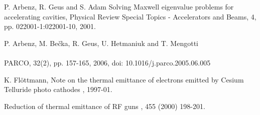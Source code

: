 \begin{thebibliography}{10}

P. Arbenz, R. Geus and S. Adam
{Solving Maxwell eigenvalue problems for accelerating cavities,
Physical Review Special Topics - Accelerators and Beams,
4, pp. 022001-1:022001-10, 2001.}

P. Arbenz, M. Be\v{c}ka, R. Geus, U. Hetmaniuk and T. Mengotti\\
\\
PARCO, 32(2), pp. 157-165, 2006, doi: 10.1016/j.parco.2005.06.005


K. Fl\"ottmann,
Note on the thermal emittance of electrons emitted by Cesium Telluride photo cathodes
, 1997-01.

Reduction of thermal emittance of RF guns
, 455 (2000) 198-201.


 
\end{thebibliography}
